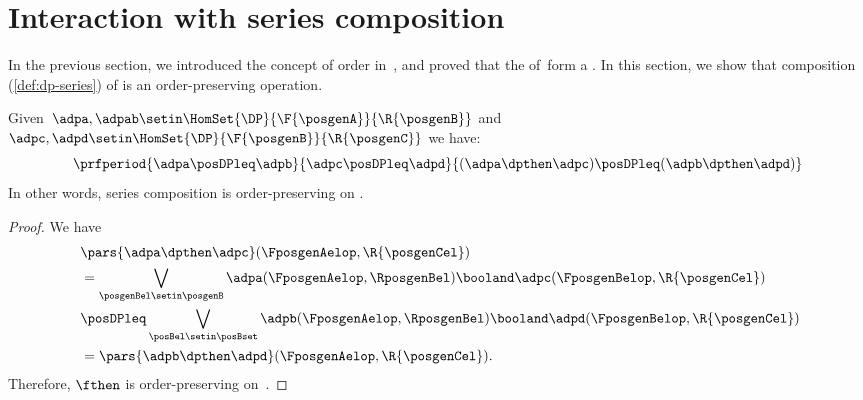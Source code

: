 
\section{Interaction with series composition}
In the previous section, we introduced the concept of order in~\DP, and proved that the  of~\DP form a .
In this section, we show that composition (\cref{def:dp-series}) of  is an order-preserving operation.

\begin{lemma}
    \label{lem:series_pres_order}
    Given~$\adpa,\adpab \setin \HomSet{\DP}{\F{\posgenA}}{\R{\posgenB}}$ and~$\adpc,\adpd \setin \HomSet{\DP}{\F{\posgenB}}{\R{\posgenC}}$ we have:
    \begin{equation}
        \prfperiod{
            \adpa\posDPleq \adpb
        }{
            \adpc\posDPleq \adpd
        }{
            (\adpa\dpthen \adpc) \posDPleq (\adpb\dpthen \adpd)
        }
    \end{equation}
    In other words, series composition is order-preserving on \DP.
\end{lemma}

\begin{proof}
    We have
    \begin{equation}
        \label{eq:series_pres_ord}
        \begin{aligned}
            ~ & \pars{ \adpa\dpthen \adpc}(\FposgenAelop,\R{\posgenCel}) \\
              & = \bigvee_{\posgenBel\setin \posgenB}\adpa(\FposgenAelop,\RposgenBel)\booland \adpc(\FposgenBelop,\R{\posgenCel}) \\
              & \posDPleq \bigvee_{\posBel\setin \posBset} \adpb(\FposgenAelop,\RposgenBel)\booland \adpd(\FposgenBelop,\R{\posgenCel}) \\
              & =\pars{ \adpb\dpthen \adpd}(\FposgenAelop,\R{\posgenCel}).
        \end{aligned}
    \end{equation}
    Therefore, $\fthen$ is order-preserving on~\DP.
\end{proof}

